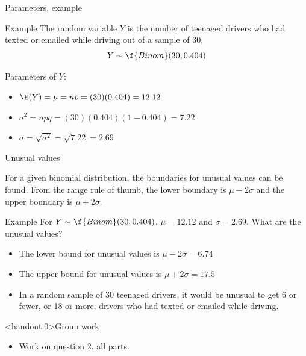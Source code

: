 \documentclass[xcolor=table, handout]{beamer}
\begin{document}
\begin{frame}{Parameters, example}
\begin{exampleblock}{Example}
The random variable $Y$ is the number of teenaged drivers who had texted or emailed while driving out of a sample of 30,
\[Y \sim \f{Binom}(30, 0.404)\]

Parameters of $Y$:
\begin{itemize}
\pause\item $\E(Y) = \mu = np = (30)(0.404) = 12.12$
\pause\item $\sigma^2 = npq = (30)(0.404)(1-0.404) = 7.22$
\pause\item $\sigma = \sqrt{\sigma^2} = \sqrt{7.22} = 2.69$
\end{itemize}
\end{exampleblock}
\end{frame}

\begin{frame}{Unusual values}
\begin{block}{}
For a given binomial distribution, the boundaries for unusual values can be found. From the range rule of thumb, the lower boundary is $\mu - 2 \sigma$ and the upper boundary is $\mu + 2\sigma$.
\end{block}
\pause
\begin{exampleblock}{Example}
For $Y \sim \f{Binom}(30, 0.404)$, $\mu = 12.12$ and $\sigma = 2.69$. What are the unusual values?
\begin{itemize}
\pause\item The lower bound for unusual values is $\mu - 2 \sigma = 6.74$
\pause\item The upper bound for unusual values is $\mu + 2 \sigma = 17.5$
\pause\item In a random sample of 30 teenaged drivers, it would be unusual to get 6 or fewer, or 18 or more, drivers who had texted or emailed while driving.
\end{itemize}
\end{exampleblock}
\end{frame}

\begin{frame}<handout:0>{Group work}
\begin{block}{}
\large
\begin{itemize}
\item Work on question 2, all parts.
\end{itemize}
\end{block}
\end{frame}
\end{document}
